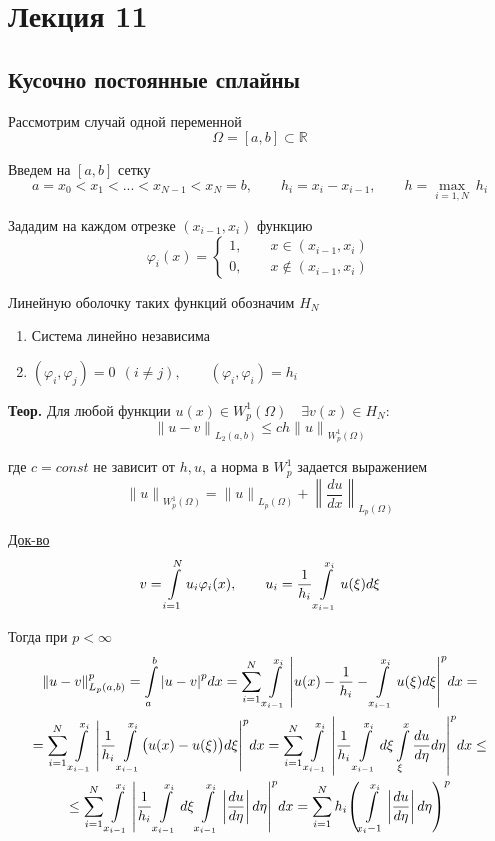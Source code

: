 \section{Лекция 11}

\subsection{Кусочно постоянные сплайны}

Рассмотрим случай одной переменной
\[ \Omega = [a, b] \subset \mathbb{R} \]

Введем на $[a, b]$ сетку 
\[ a = x_0 < x_1 < ... < x_{N-1} < x_N = b, \qquad h_i = x_i - x_{i-1}, \qquad h = \underset{i=1, N}{\max} \ h_i \]

Зададим на каждом отрезке $(x_{i-1}, x_i)$ функцию
\[ \varphi_i (x) =  \left\{ \begin{array}{l}
	1, \qquad x \in (x_{i-1}, x_i) \\
	0, \qquad x \not \in (x_{i-1}, x_i)
\end{array} \right. \]

Линейную оболочку таких функций обозначим $H_N$

\begin{enumerate}
	\item Система линейно независима
	\item $ (\varphi_i, \varphi_j) = 0 \ \ (i \neq j), \qquad (\varphi_i, \varphi_i) = h_i $
\end{enumerate}

\textbf{Теор.} Для любой функции $u(x) \in W_p^1 (\Omega) \quad \exists v(x) \in H_N$:
\[ {\| u - v \|}_{L_2(a,b)} \leq c h {\|u\|}_{W_p^1 (\Omega)} \]

где $c = const$ не зависит от $h, u$, а норма в $W_p^1$ задается выражением
\[ {\|u\|}_{W_p^1(\Omega)} = {\|u\|}_{L_p (\Omega)} + {\left\| \frac{du}{dx} \right\|}_{L_p (\Omega)} \]

\underline{Док-во}
\[ v = \int\limits_{i=1}^{N} u_i \varphi_i(x), \qquad u_i = \frac{1}{h_i} \int\limits_{x_{i-1}}^{x_i} u(\xi)d \xi \]

Тогда при $p < \infty$
\begin{multline*}
	{\|u-v\|}^p_{L_p(a,b)} = \int\limits_{a}^{b} {|u - v|}^p dx = \sum\limits_{i=1}^{N} \int\limits_{x_{i-1}}^{x_i} {\left|u(x) - \frac{1}{h_i} - \int\limits_{x_{i-1}}^{x_i} u (\xi) d \xi \right|}^p dx = \\
	= \sum\limits_{i=1}^{N} \int\limits_{x_{i-1}}^{x_i} {\left| \frac{1}{h_i} \int\limits_{x_{i-1}}^{x_i} \bigl( u(x) - u(\xi) \bigr) d\xi \right|}^p dx = \sum\limits_{i=1}^{N} \int\limits_{x_{i-1}}^{x_i} {\left| \frac{1}{h_i} \int\limits_{x_{i-1}}^{x_i} d \xi \int\limits_{\xi}^{x} \frac{du}{d\eta} d \eta \right|}^p dx \leq \\
	\leq \sum\limits_{i=1}^{N} \int\limits_{x_{i-1}}^{x_i}{ \left| \frac{1}{h_i} \int\limits_{x_{i-1}}^{x_i} d \xi \int\limits_{x_{i-1}}^{x_i} \left| \frac{du}{d\eta} \right| d \eta \right|}^p dx = \sum\limits_{i=1}^{N} h_i {\left( \int\limits_{x_i-1}^{x_i} \left| \frac{du}{d\eta} \right| d \eta \right)}^p
\end{multline*}

